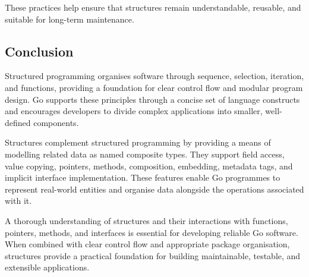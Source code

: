 These practices help ensure that structures remain understandable, reusable, and suitable for long-term maintenance.

\subsection{Conclusion}

Structured programming organises software through sequence, selection, iteration, and functions, providing a foundation for clear control flow and modular program design. Go supports these principles through a concise set of language constructs and encourages developers to divide complex applications into smaller, well-defined components.

Structures complement structured programming by providing a means of modelling related data as named composite types. They support field access, value copying, pointers, methods, composition, embedding, metadata tags, and implicit interface implementation. These features enable Go programmes to represent real-world entities and organise data alongside the operations associated with it.

A thorough understanding of structures and their interactions with functions, pointers, methods, and interfaces is essential for developing reliable Go software. When combined with clear control flow and appropriate package organisation, structures provide a practical foundation for building maintainable, testable, and extensible applications.

